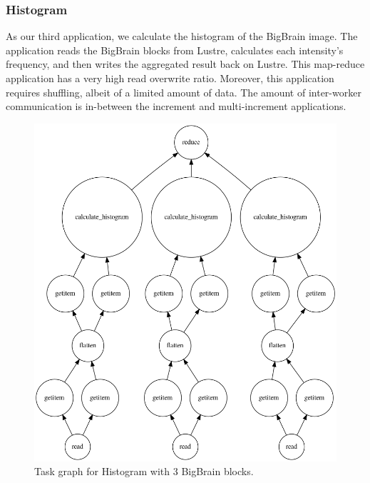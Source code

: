 \documentclass[conference]{IEEEtran}
\begin{document}
\subsubsection{Histogram}
As our third application, we calculate the histogram of the BigBrain image. 
The application reads the BigBrain blocks from Lustre, calculates each intensity's frequency, and then writes the aggregated result back on Lustre.
This map-reduce application has a very high read overwrite ratio.
Moreover, this application requires shuffling, albeit of a limited amount of data. 
The amount of inter-worker communication is in-between the increment and multi-increment applications.
\begin{figure}[!hb]
	\centering
	\includegraphics[height=\columnwidth,
	angle=0]{figures/histogram.png}
	\caption{Task graph for Histogram with 3 BigBrain blocks.}
	\label{fig:graph-histogram}
\end{figure}
			
\end{document}
